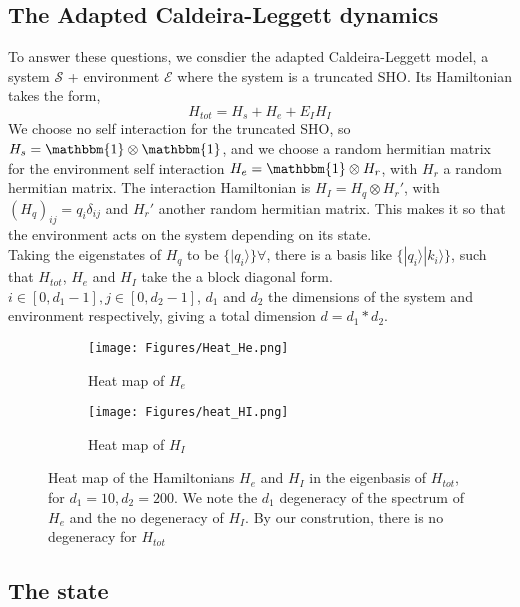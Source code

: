 \documentclass{article}
\begin{document}
\subsection{The Adapted Caldeira-Leggett dynamics}
To answer these questions, we consdier the adapted Caldeira-Leggett model, a system $\mathcal{S}$ + environment $\mathcal{E}$ where the system is a truncated SHO. Its Hamiltonian takes the form,
\begin{equation}    
    H_{tot}=H_s+H_e+E_IH_I
\end{equation}
We choose no self interaction for the truncated SHO, so $H_s=\mathbbm{1}\otimes\mathbbm{1}$, and we choose a random hermitian matrix for the environment self interaction $H_e=\mathbbm{1}\otimes H_r$, with $H_r$ a random hermitian matrix. The interaction Hamiltonian is $H_I=H_q\otimes H_r'$, with $(H_q)_{ij}=q_i\delta_{ij}$ and $H_r'$ another random hermitian matrix. This makes it so that the environment acts on the system depending on its state. \\
Taking the eigenstates of $H_q$ to be $\{|q_i\rangle\}\forall$, there is a basis like $\{|q_i\rangle|k_i\rangle\}$, such that $H_{tot}$, $H_e$ and $H_I$ take the a block diagonal form. $i\in[0,d_1-1],j\in [0,d_2-1]$, $d_1$ and $d_2$ the dimensions of the system and environment respectively, giving a total dimension $d=d_1*d_2$.
\begin{figure}[h!]
  \centering
  \begin{subfigure}[b]{0.4\linewidth}
    \texttt{[image: Figures/Heat\_He.png]}
    \label{fig:1}
    \caption{Heat map of $H_e$}
  \end{subfigure}
  \begin{subfigure}[b]{0.4\linewidth}
    \texttt{[image: Figures/heat\_HI.png]}
    \label{fig:2}
    \caption{Heat map of $H_I$}
  \end{subfigure}
  \caption{}
  \label{fig:dist_EI_dep}
  \caption{Heat map of the Hamiltonians $H_e$ and $H_I$ in the eigenbasis of $H_{tot}$, for $d_1=10,d_2=200$. We note the $d_1$ degeneracy of the spectrum of $H_e$ and the no degeneracy of $H_I$. By our constrution, there is no degeneracy for $H_{tot}$}
\end{figure}

\subsection{The state}
\end{document}
